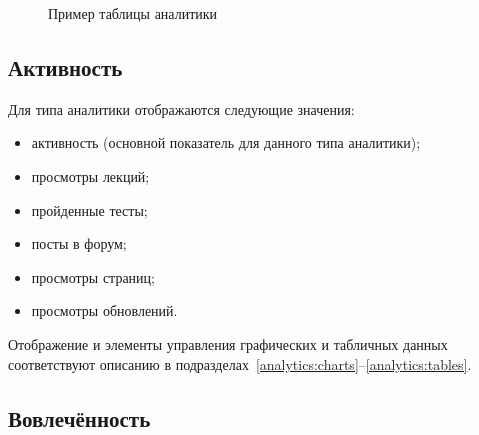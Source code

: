 \begin{figure}[H]
	\caption{Пример таблицы аналитики}
	\label{analytics:table}
\end{figure}

\subsection{Активность}
\label{analytics:activity}

Для типа аналитики  отображаются следующие значения:
\begin{itemize}
	\item активность (основной показатель для данного типа аналитики);
	\item просмотры лекций;
	\item пройденные тесты;
	\item посты в форум;
	\item просмотры страниц;
	\item просмотры обновлений.
\end{itemize}

Отображение и элементы управления графических и табличных данных соответствуют описанию в 
подразделах~\ref{analytics:charts}--\ref{analytics:tables}.

\subsection{Вовлечённость}
\label{analytics:involvement}

